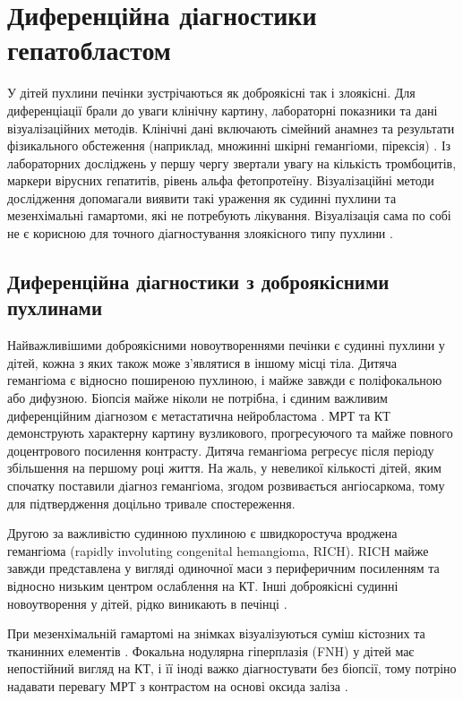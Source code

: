 \section{Диференційна діагностики гепатобластом}
У дітей пухлини печінки зустрічаються як доброякісні так і злоякісні. Для диференціації брали до уваги клінічну картину, лабораторні показники та дані візуалізаційних методів. Клінічні дані включають сімейний анамнез  та результати фізикального обстеження (наприклад, множинні шкірні гемангіоми, пірексія) \cite{pmid20938901}. Із лабораторних досліджень у першу чергу звертали увагу на  кількість тромбоцитів, маркери вірусних гепатитів, рівень альфа фетопротеїну. Візуалізаційні методи дослідження допомагали виявити такі ураження як судинні пухлини та мезенхімальні гамартоми, які не потребують лікування. Візуалізація сама по собі не є корисною для точного діагностування злоякісного типу пухлини \cite{pmid20922397}.

\subsection{Диференційна діагностики з доброякісними пухлинами}
Найважливішими доброякісними новоутвореннями печінки є судинні пухлини у дітей, кожна з яких також може з’являтися в іншому місці тіла. Дитяча гемангіома є відносно поширеною пухлиною, і майже завжди є поліфокальною або дифузною. Біопсія майже ніколи не потрібна, і єдиним важливим диференційним діагнозом є метастатична нейробластома \cite{pmid21370433}. МРТ та КТ демонструють характерну картину вузликового, прогресуючого та майже повного доцентрового посилення контрасту. Дитяча гемангіома регресує після періоду збільшення на першому році життя. На жаль, у невеликої кількості дітей, яким спочатку поставили діагноз гемангіома, згодом розвивається ангіосаркома, тому для підтвердження доцільно тривале спостереження.

Другою за важливістю судинною пухлиною є швидкоростуча вроджена гемангіома (rapidly involuting congenital hemangioma, RICH). RICH майже завжди представлена у вигляді одиночної маси з периферичним посиленням та відносно низьким центром ослаблення на КТ. Інші доброякісні судинні новоутворення у дітей, рідко виникають в печінці \cite{pmid21509775}.

При мезенхімальній гамартомі на знімках візуалізуються суміш кістозних та тканинних елементів \cite{pmid21621153}. Фокальна нодулярна гіперплазія (FNH) у дітей має непостійний вигляд на КТ, і її іноді важко діагностувати без біопсії, тому потріно надавати перевагу МРТ з контрастом на основі оксида заліза \cite{pmid21830412}.

